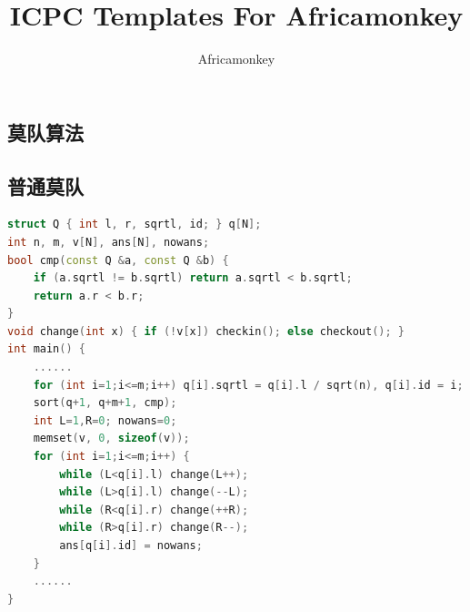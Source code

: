 \documentclass{article}
\begin{document}
\begin{CJK}{UTF8}{song}
\title{ICPC Templates For Africamonkey}
\author {Africamonkey}
\maketitle
\tableofcontents
\newpage
\section{莫队算法}
\subsection{普通莫队}
\begin{lstlisting}[language=C++]
struct Q { int l, r, sqrtl, id; } q[N];
int n, m, v[N], ans[N], nowans;
bool cmp(const Q &a, const Q &b) {
	if (a.sqrtl != b.sqrtl) return a.sqrtl < b.sqrtl;
	return a.r < b.r;
}
void change(int x) { if (!v[x]) checkin(); else checkout(); }
int main() {
	......
	for (int i=1;i<=m;i++) q[i].sqrtl = q[i].l / sqrt(n), q[i].id = i;
	sort(q+1, q+m+1, cmp);
	int L=1,R=0; nowans=0;
	memset(v, 0, sizeof(v));
	for (int i=1;i<=m;i++) {
		while (L<q[i].l) change(L++);
		while (L>q[i].l) change(--L);
		while (R<q[i].r) change(++R);
		while (R>q[i].r) change(R--);
		ans[q[i].id] = nowans;
	}
	......
}
\end{lstlisting}

\end{CJK}
\end{document}
